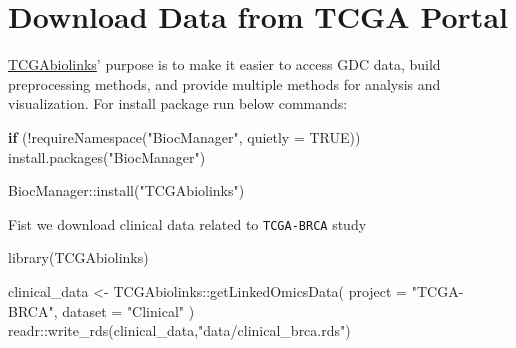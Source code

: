\documentclass[
]{book}
\newenvironment{Shaded}{\begin{snugshade}}{\end{snugshade}}
\newcommand{\AttributeTok}[1]{\textcolor[rgb]{0.77,0.63,0.00}{#1}}
\newcommand{\ConstantTok}[1]{\textcolor[rgb]{0.00,0.00,0.00}{#1}}
\newcommand{\ControlFlowTok}[1]{\textcolor[rgb]{0.13,0.29,0.53}{\textbf{#1}}}
\newcommand{\FunctionTok}[1]{\textcolor[rgb]{0.00,0.00,0.00}{#1}}
\newcommand{\NormalTok}[1]{#1}
\newcommand{\OtherTok}[1]{\textcolor[rgb]{0.56,0.35,0.01}{#1}}
\newcommand{\SpecialCharTok}[1]{\textcolor[rgb]{0.00,0.00,0.00}{#1}}
\newcommand{\StringTok}[1]{\textcolor[rgb]{0.31,0.60,0.02}{#1}}
\begin{document}
\hypertarget{download-data-from-tcga-portal}{%
\section{Download Data from TCGA Portal}\label{download-data-from-tcga-portal}}

\href{https://bioconductor.org/packages/release/bioc/html/TCGAbiolinks.html}{TCGAbiolinks}' purpose is to make it easier to access GDC data, build preprocessing methods, and provide multiple methods for analysis and visualization. For install package run below commands:

\begin{Shaded}
\begin{Highlighting}[]
\ControlFlowTok{if}\NormalTok{ (}\SpecialCharTok{!}\FunctionTok{requireNamespace}\NormalTok{(}\StringTok{"BiocManager"}\NormalTok{, }\AttributeTok{quietly =} \ConstantTok{TRUE}\NormalTok{))}
    \FunctionTok{install.packages}\NormalTok{(}\StringTok{"BiocManager"}\NormalTok{)}

\NormalTok{BiocManager}\SpecialCharTok{::}\FunctionTok{install}\NormalTok{(}\StringTok{"TCGAbiolinks"}\NormalTok{)}
\end{Highlighting}
\end{Shaded}

Fist we download clinical data related to \texttt{TCGA-BRCA} study

\begin{Shaded}
\begin{Highlighting}[]
\FunctionTok{library}\NormalTok{(TCGAbiolinks)}

\NormalTok{clinical\_data }\OtherTok{\textless{}{-}}\NormalTok{ TCGAbiolinks}\SpecialCharTok{::}\FunctionTok{getLinkedOmicsData}\NormalTok{(}
  \AttributeTok{project =} \StringTok{"TCGA{-}BRCA"}\NormalTok{,}
  \AttributeTok{dataset =} \StringTok{"Clinical"}
\NormalTok{)}
\NormalTok{readr}\SpecialCharTok{::}\FunctionTok{write\_rds}\NormalTok{(clinical\_data,}\StringTok{"data/clinical\_brca.rds"}\NormalTok{)}
\end{Highlighting}
\end{Shaded}

\newpage
\end{document}
